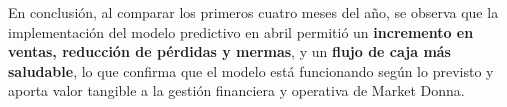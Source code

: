 En conclusión, al comparar los primeros cuatro meses del año, se observa que la implementación del modelo predictivo en abril permitió un \textbf{incremento en ventas, reducción de pérdidas y mermas}, y un \textbf{flujo de caja más saludable}, lo que confirma que el modelo está funcionando según lo previsto y aporta valor tangible a la gestión financiera y operativa de Market Donna.





		

